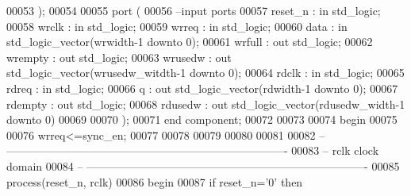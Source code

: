 \begin{DoxyCode}
00053   );  
00054 
00055   \textcolor{keywordflow}{port} (
00056 \textcolor{keyword}{      --input ports }
00057       reset_n       : \textcolor{keywordflow}{in} \textcolor{comment}{std\_logic};
00058       wrclk         : \textcolor{keywordflow}{in} \textcolor{comment}{std\_logic};
00059       wrreq         : \textcolor{keywordflow}{in} \textcolor{comment}{std\_logic};
00060       data          : \textcolor{keywordflow}{in} \textcolor{comment}{std\_logic\_vector}(wrwidth\textcolor{vhdlchar}{-}\textcolor{vhdllogic}{}\textcolor{vhdllogic}{1} \textcolor{keywordflow}{downto} \textcolor{vhdllogic}{}\textcolor{vhdllogic}{0});
00061       wrfull        : \textcolor{keywordflow}{out} \textcolor{comment}{std\_logic};
00062         wrempty       : \textcolor{keywordflow}{out} \textcolor{comment}{std\_logic};
00063       wrusedw       : \textcolor{keywordflow}{out} \textcolor{comment}{std\_logic\_vector}(wrusedw_witdth\textcolor{vhdlchar}{-}\textcolor{vhdllogic}{}\textcolor{vhdllogic}{1} \textcolor{keywordflow}{downto} \textcolor{vhdllogic}{}\textcolor{vhdllogic}{0});
00064       rdclk          : \textcolor{keywordflow}{in} \textcolor{comment}{std\_logic};
00065       rdreq         : \textcolor{keywordflow}{in} \textcolor{comment}{std\_logic};
00066       q             : \textcolor{keywordflow}{out} \textcolor{comment}{std\_logic\_vector}(rdwidth\textcolor{vhdlchar}{-}\textcolor{vhdllogic}{}\textcolor{vhdllogic}{1} \textcolor{keywordflow}{downto} \textcolor{vhdllogic}{}\textcolor{vhdllogic}{0});
00067       rdempty       : \textcolor{keywordflow}{out} \textcolor{comment}{std\_logic};
00068       rdusedw       : \textcolor{keywordflow}{out} \textcolor{comment}{std\_logic\_vector}(rdusedw_width\textcolor{vhdlchar}{-}\textcolor{vhdllogic}{}\textcolor{vhdllogic}{1} \textcolor{keywordflow}{downto} \textcolor{vhdllogic}{}\textcolor{vhdllogic}{0})     
00069         
00070         );
00071 \textcolor{keywordflow}{end} \textcolor{keywordflow}{component};
00072 
00073   
00074 \textcolor{vhdlkeyword}{begin}
00075 
00076 \textcolor{vhdlchar}{wrreq}\textcolor{vhdlchar}{<=}\textcolor{vhdlchar}{sync_en}; 
00077 
00078 
00079   
00080 
00081 
00082 \textcolor{keyword}{-- ----------------------------------------------------------------------------}
00083 \textcolor{keyword}{-- rclk clock domain}
00084 \textcolor{keyword}{-- ----------------------------------------------------------------------------}
00085   \textcolor{keywordflow}{process}(reset_n, rclk)
00086 \textcolor{vhdlkeyword}{    begin}
00087       \textcolor{keywordflow}{if} \textcolor{vhdlchar}{reset_n}\textcolor{vhdlchar}{=}\textcolor{vhdlchar}{'}\textcolor{vhdllogic}{}\textcolor{vhdllogic}{0}\textcolor{vhdlchar}{'} \textcolor{keywordflow}{then}

\end{DoxyCode}
